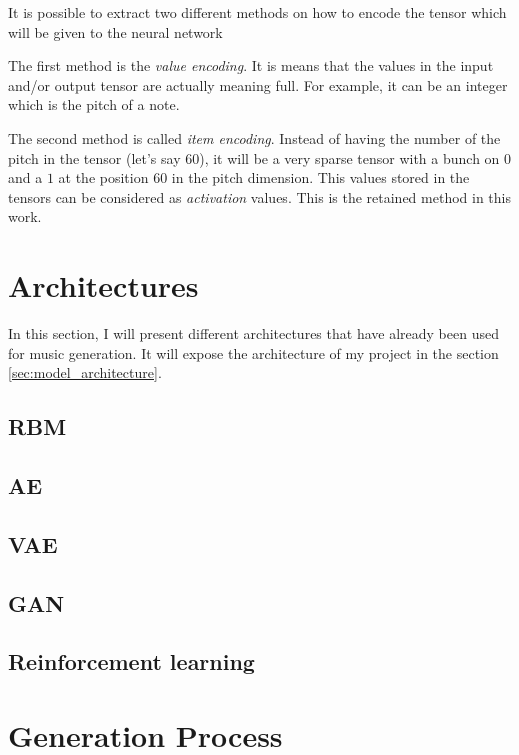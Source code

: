 \documentclass[12pt]{report}
\begin{document}
It is possible to extract two different methods on how to encode the tensor which will be given to the neural network

The first method is the \textit{value encoding}.
It is means that the values in the input and/or output tensor are actually meaning full.
For example, it can be an integer which is the pitch of a note.

The second method is called \textit{item encoding}.
Instead of having the number of the pitch in the tensor (let's say $60$), it will be a very sparse tensor with a bunch on $0$ and a $1$ at the position $60$ in the pitch dimension.
This values stored in the tensors can be considered as \textit{activation} values.
This is the retained method in this work.


\section{Architectures}

In this section, I will present different architectures that have already been used for music generation. It will expose the architecture of my project in the section \ref{sec:model_architecture}.

\subsection{RBM}

\subsection{AE}

\subsection{VAE}

\subsection{GAN}

\subsection{Reinforcement learning}

\section{Generation Process}
\end{document}

